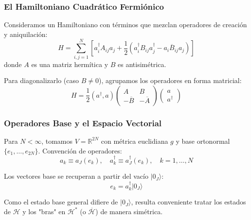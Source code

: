 
\begin{frame}
  \frametitle{El Hamiltoniano Cuadrático Fermiónico}
  
  Consideramos un Hamiltoniano con términos que mezclan operadores de creación y aniquilación:
  \begin{equation}
    H = \sum_{i,j=1}^{N} \left[ a_{i}^{\dagger} A_{ij} a_{j} + \frac{1}{2} (a_{i}^{\dagger} B_{ij} a_{j}^{\dagger} - a_{i} \overline{B}_{ij} a_{j}) \right]
    \label{eq:III.1}
  \end{equation}
  donde $A$ es una matriz hermítica y $B$ es antisimétrica.
  
  \vspace{0.3cm}
  Para diagonalizarlo (caso $B \neq 0$), agrupamos los operadores en forma matricial:
  \begin{equation}
    H = \frac{1}{2} (a^{\dagger}, a) \begin{pmatrix} A & B \\ -\overline{B} & -\overline{A} \end{pmatrix} \begin{pmatrix} a \\ a^{\dagger} \end{pmatrix}
    \label{eq:III.2}
  \end{equation}
\end{frame}

\begin{frame}
  \frametitle{Operadores Base y el Espacio Vectorial}

  Para $N < \infty$, tomamos $V = \mathbb{R}^{2N}$ con métrica euclidiana $g$ y base ortonormal $\{e_1, \dots, e_{2N}\}$. Convención de operadores:
  \begin{equation}
    a_k \equiv a_J(e_k), \quad a_k^{\dagger} \equiv a_J^{\dagger}(e_k), \quad k=1,\dots,N
    \label{eq:III.3}
  \end{equation}

  Los vectores base se recuperan a partir del vacío $|0_J\rangle$:
  \begin{equation}
    e_k = a_k^{\dagger} |0_J\rangle
    \label{eq:III.4}
  \end{equation}

  Como el estado base general difiere de $|0_J\rangle$, resulta conveniente tratar los estados de $\mathcal{H}$ y los "bras" en $\mathcal{H}^*$ (o $\overline{\mathcal{H}}$) de manera simétrica.
\end{frame}

